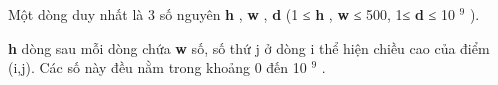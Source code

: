 Một dòng duy nhất là 3 số nguyên   \textbf{    h   }   ,   \textbf{    w   }   ,   \textbf{    d   }   (1 ≤   \textbf{    h   }   ,   \textbf{    w   }   ≤ 500, 1≤   \textbf{    d   }   ≤ 10   $^    9   $   ).  

\textbf{    h   }   dòng sau mỗi dòng chứa   \textbf{    w   }   số, số thứ j ở dòng i thể hiện chiều cao của điểm (i,j). Các số này đều nằm trong khoảng 0 đến 10   $^    9   $   .